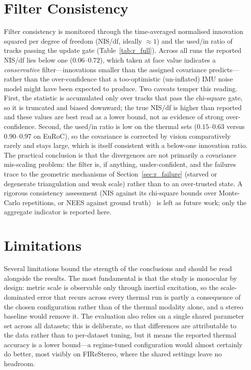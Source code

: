 \section{Filter Consistency}
\label{sec:r_consistency}
Filter consistency is monitored through the time-averaged normalised innovation squared per degree of freedom (NIS/df, ideally $\approx 1$) and the used/in ratio of tracks passing the update gate (Table~\ref{tab:r_full}). Across all runs the reported NIS/df lies below one ($0.06$--$0.72$), which taken at face value indicates a \emph{conservative} filter---innovations smaller than the assigned covariance predicts---rather than the over-confidence that a too-optimistic (un-inflated) IMU noise model might have been expected to produce. Two caveats temper this reading. First, the statistic is accumulated only over tracks that pass the chi-square gate, so it is truncated and biased downward; the true NIS/df is higher than reported and these values are best read as a lower bound, not as evidence of strong over-confidence. Second, the used/in ratio is low on the thermal sets ($0.15$--$0.63$ versus $0.90$--$0.97$ on EuRoC), so the covariance is corrected by vision comparatively rarely and stays large, which is itself consistent with a below-one innovation ratio. The practical conclusion is that the divergences are not primarily a covariance mis-scaling problem: the filter is, if anything, under-confident, and the failures trace to the geometric mechanisms of Section~\ref{sec:r_failure} (starved or degenerate triangulation and weak scale) rather than to an over-trusted state. A rigorous consistency assessment (NIS against its chi-square bounds over Monte-Carlo repetitions, or NEES against ground truth)~\cite{BarShalom_2001} is left as future work; only the aggregate indicator is reported here.

\section{Limitations}
\label{sec:r_limitations}
Several limitations bound the strength of the conclusions and should be read alongside the results. The most fundamental is that the study is monocular by design: metric scale is observable only through inertial excitation, so the scale-dominated error that recurs across every thermal run is partly a consequence of the chosen configuration rather than of the thermal modality alone, and a stereo baseline would remove it. The evaluation also relies on a single shared parameter set across all datasets; this is deliberate, so that differences are attributable to the data rather than to per-dataset tuning, but it means the reported thermal accuracy is a lower bound---a regime-tuned configuration would almost certainly do better, most visibly on FIReStereo, where the shared settings leave no headroom.

